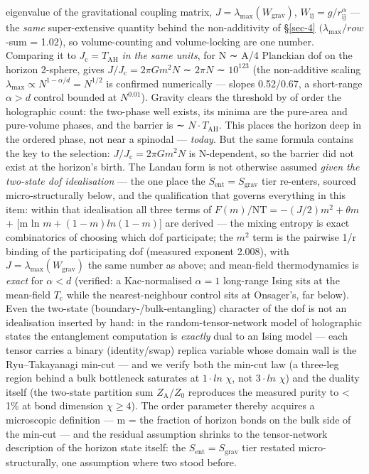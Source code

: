 \documentclass[aps,prd,preprint,nofootinbib,superscriptaddress]{revtex4-2}
\begin{document}
\begin{enumerate}
  eigenvalue of the gravitational coupling matrix,
  \(J = \lambda _{\mathrm{max}}(W_{\mathrm{grav}})\),
  \(W_{\mathrm{ij}} = g/r_{\mathrm{ij}}^{\alpha }\) --- the \emph{same}
  super-extensive quantity behind the non-additivity of §\ref{sec-4}
  \((\lambda _{\mathrm{max}}/row\)-sum = 1.02), so volume-counting and
  volume-locking are one number. Comparing it to
  \(J_{\mathrm{c}} = T_\mathrm{AH}\) \emph{in the same units}, for N ∼
  A/4 Planckian dof on the horizon 2-sphere, gives
  \(J/J_{\mathrm{c}} = 2\pi Gm^{2}N\) ∼ \(2\pi N\) ∼ \(10^{123}\) (the
  non-additive scaling
  \(\lambda _{\mathrm{max}} \propto  N^{1-\alpha /d} = N^{1/2}\) is
  confirmed numerically --- slopes 0.52/0.67, a short-range
  \(\alpha >d\) control bounded at \(N^{0.01}\)). Gravity clears the
  threshold by of order the holographic count: the two-phase well
  exists, its minima are the pure-area and pure-volume phases, and the
  barrier is ∼ \(N\cdot T_\mathrm{AH}\). This places the horizon deep in
  the ordered phase, not near a spinodal --- \emph{today}. But the same
  formula contains the key to the selection:
  \(J/J_{\mathrm{c}} = 2\pi Gm^{2}N\) is N-dependent, so the barrier did
  not exist at the horizon's birth. The Landau form is not otherwise
  assumed \emph{given the two-state dof idealisation} --- the one place
  the \(S_{\mathrm{ent}} = S_{\mathrm{grav}}\) tier re-enters, sourced
  micro-structurally below, and the qualification that governs
  everything in this item: within that idealisation all three terms of
  \(F(m)/\mathrm{NT} = -(J/2)m^{2} + \theta m\)+ {[}m ln
  \(m + (1-m)ln(1-m)\){]} are derived --- the mixing entropy is exact
  combinatorics of choosing which dof participate; the \(m^{2}\) term is
  the pairwise 1/r binding of the participating dof (measured exponent
  2.008), with \(J = \lambda _{\mathrm{max}}(W_{\mathrm{grav}})\) the
  same number as above; and mean-field thermodynamics is \emph{exact}
  for \(\alpha  < d\) \cite{Campa:2009jxa} (verified: a Kac-normalised
  \(\alpha  = 1\) long-range Ising sits at the mean-field
  \(T_{\mathrm{c}}\) while the nearest-neighbour control sits at
  Onsager's, far below). Even the two-state (boundary-/bulk-entangling)
  character of the dof is not an idealisation inserted by hand: in the
  random-tensor-network model of holographic states
  \cite{Hayden:2016cfa} the entanglement computation is \emph{exactly}
  dual to an Ising model --- each tensor carries a binary
  (identity/swap) replica variable whose domain wall is the
  Ryu--Takayanagi min-cut --- and we verify both the min-cut law (a
  three-leg region behind a bulk bottleneck saturates at \(1\cdot ln\)
  \(\chi\), not \(3\cdot ln\) \(\chi\)) and the duality itself (the
  two-state partition sum \(Z_{\mathrm{A}}/Z_{0}\) reproduces the
  measured purity to \textless{} 1\% at bond dimension
  \(\chi  \geq  4\)). The order parameter thereby acquires a microscopic
  definition --- m = the fraction of horizon bonds on the bulk side of
  the min-cut --- and the residual assumption shrinks to the
  tensor-network description of the horizon state itself: the
  \(S_{\mathrm{ent}} = S_{\mathrm{grav}}\) tier restated
  micro-structurally, one assumption where two stood before.
\end{enumerate}
\end{document}
